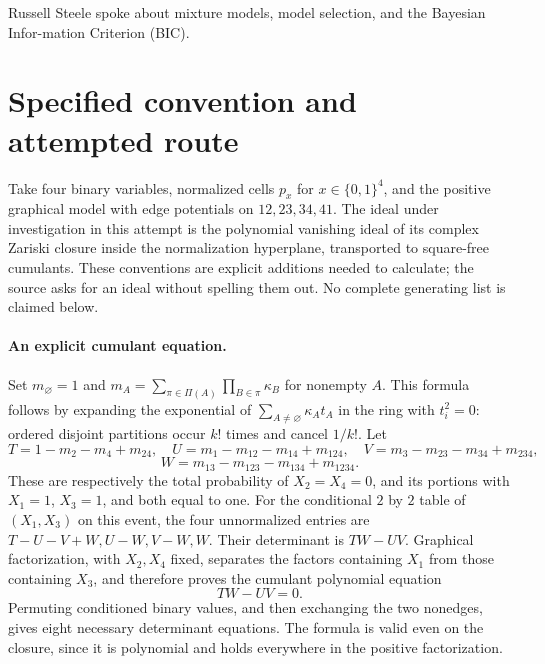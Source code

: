 \documentclass[11pt]{article}
\begin{document}
Russell Steele spoke about mixture models, model selection, and the Bayesian Infor-mation Criterion (BIC).

\section{Specified convention and attempted route}
Take four binary variables, normalized cells $p_x$ for $x\in\{0,1\}^4$,
and the positive graphical model with edge potentials on
$12,23,34,41$. The ideal under investigation in this attempt is the
polynomial vanishing ideal of its complex Zariski closure inside the
normalization hyperplane, transported to square-free cumulants. These
conventions are explicit additions needed to calculate; the source asks
for an ideal without spelling them out. No complete generating list is
claimed below.

\paragraph{An explicit cumulant equation.}
Set $m_\varnothing=1$ and
$m_A=\sum_{\pi\in\Pi(A)}\prod_{B\in\pi}\kappa_B$ for nonempty $A$.
This formula follows by expanding the exponential of
$\sum_{A\ne\varnothing}\kappa_A t_A$ in the ring with $t_i^2=0$:
ordered disjoint partitions occur $k!$ times and cancel $1/k!$.
Let
\[
T=1-m_2-m_4+m_{24},\quad U=m_1-m_{12}-m_{14}+m_{124},
\quad V=m_3-m_{23}-m_{34}+m_{234},
\]
\[
W=m_{13}-m_{123}-m_{134}+m_{1234}.
\]
These are respectively the total probability of $X_2=X_4=0$, and
its portions with $X_1=1$, $X_3=1$, and both equal to one.
For the conditional $2$ by $2$ table of $(X_1,X_3)$ on this event,
the four unnormalized entries are $T-U-V+W,U-W,V-W,W$.
Their determinant is $TW-UV$. Graphical factorization, with $X_2,X_4$
fixed, separates the factors containing $X_1$ from those containing
$X_3$, and therefore proves the cumulant polynomial equation
\[
TW-UV=0.
\]
Permuting conditioned binary values, and then exchanging the two
nonedges, gives eight necessary determinant equations. The formula is
valid even on the closure, since it is polynomial and holds everywhere
in the positive factorization.
\end{document}
